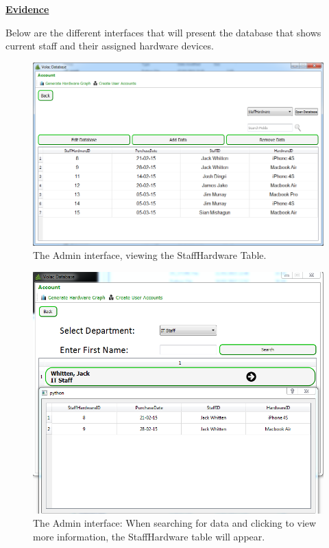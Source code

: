 \underline{\textbf{Evidence}}

Below are the different interfaces that will present the database that shows current staff and their assigned hardware devices.

\begin{figure}[H]
    \includegraphics[width=\textwidth]{./Evaluation/Images/Database1.png}
    \caption{The Admin interface, viewing the StaffHardware Table.} \label{fig:db1}
\end{figure}

\begin{figure}[H]
    \includegraphics[width=\textwidth]{./Evaluation/Images/database3.png}
    \caption{The Admin interface: When searching for data and clicking to view more information, the StaffHardware table will appear.} \label{fig:db2}
\end{figure}

